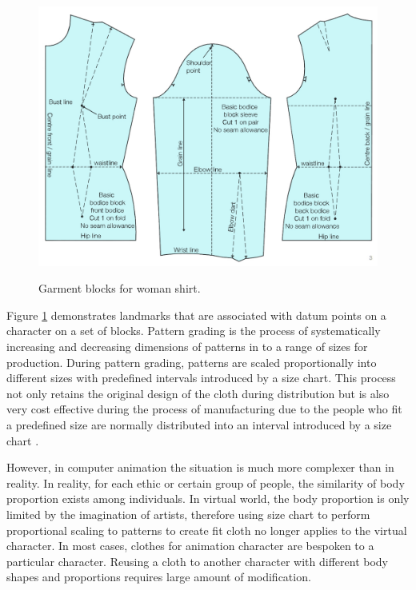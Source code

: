 \begin{figure}[H]
	\includegraphics[width=\columnwidth]{../images/garment_block}\\[0.1cm]
    \caption{Garment blocks for woman shirt.}
    \label{figure:garmentBlock}
\end{figure}

Figure \ref{figure:garmentBlock} demonstrates landmarks that are associated with datum points on a character on a set of blocks. Pattern grading is the process of systematically increasing and decreasing dimensions of patterns in to a range of sizes for production. During pattern grading, patterns are scaled proportionally into different sizes with predefined intervals introduced by a size chart. This process not only retains the original design of the cloth during distribution but is also very cost effective during the process of manufacturing due to the people who fit a predefined size are normally distributed into an interval introduced by a size chart . 

However, in computer animation the situation is much more complexer than in reality. In reality, for each ethic or certain group of people, the similarity of body proportion exists among individuals. In virtual world, the body proportion is only limited by the imagination of artists, therefore using size chart to perform proportional scaling to patterns to create fit cloth no longer applies to the virtual character. In most cases, clothes for animation character are bespoken to a particular character. Reusing a cloth to another character with different body shapes and proportions requires large amount of modification.


